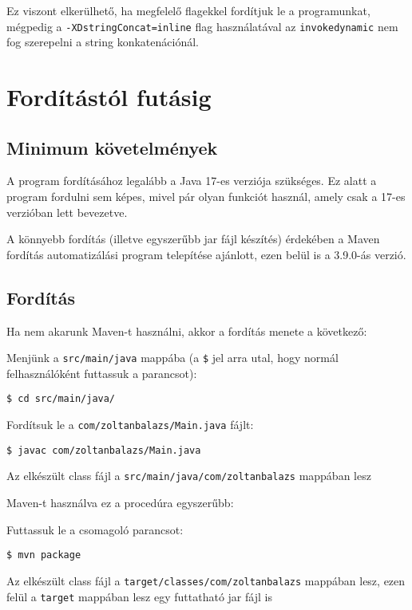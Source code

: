 Ez viszont elkerülhető, ha megfelelő flagekkel fordítjuk le a programunkat, mégpedig a \lstinline{-XDstringConcat=inline} flag használatával az \lstinline{invokedynamic} nem fog szerepelni a string konkatenációnál.

\section{Fordítástól futásig}

\subsection{Minimum követelmények}

A program fordításához legalább a Java 17-es verziója szükséges. Ez alatt a program fordulni sem képes, mivel pár olyan funkciót használ, amely csak a 17-es verzióban lett bevezetve.

A könnyebb fordítás (illetve egyszerűbb jar fájl készítés) érdekében a Maven fordítás automatizálási program telepítése ajánlott, ezen belül is a 3.9.0-ás verzió.

\subsection{Fordítás}

Ha nem akarunk Maven-t használni, akkor a fordítás menete a következő:
\begin{compactitem}
	\item Menjünk a \lstinline{src/main/java} mappába (a \lstinline{$} jel arra utal, hogy normál felhasználóként futtassuk a parancsot): 
	\begin{verbatim}
$ cd src/main/java/
	\end{verbatim}
	\item Fordítsuk le a \lstinline{com/zoltanbalazs/Main.java} fájlt:
	\begin{verbatim}
$ javac com/zoltanbalazs/Main.java
	\end{verbatim}
	\item Az elkészült class fájl a \lstinline{src/main/java/com/zoltanbalazs} mappában lesz 
\end{compactitem}

Maven-t használva ez a procedúra egyszerűbb:
\begin{compactitem}
	\item Futtassuk le a csomagoló parancsot:
	\begin{verbatim}
$ mvn package
	\end{verbatim}
	\item Az elkészült class fájl a \lstinline{target/classes/com/zoltanbalazs} mappában lesz, ezen felül a \lstinline{target} mappában lesz egy futtatható jar fájl is
\end{compactitem}

